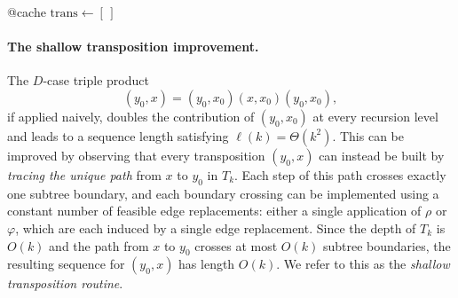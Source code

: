 \begin{algorithm}[ht]
    \DontPrintSemicolon
    \caption{Factoring a permutation into a \tFer sequence for $T_k$.}
    \label{alg:RecursiveFer}
    @cache
    \smallskip
    $\mathrm{trans} \leftarrow [\,]$\;
\end{algorithm}

\paragraph{The shallow transposition improvement.}
The $D$-case triple product $$(y_0,x)=(y_0,x_0)(x,x_0)(y_0,x_0),$$ if applied naively, doubles the contribution of $(y_0,x_0)$ at every recursion level and leads to a sequence length satisfying
$\ell(k) = \Theta(k^2)$.
This can be improved by observing that every transposition $(y_0,x)$ can instead be built by \emph{tracing the unique path} from $x$ to $y_0$ in $T_k$.
Each step of this path crosses exactly one subtree boundary, and each boundary crossing can be implemented using a constant number of feasible edge replacements: either a single application of $\rho$ or $\varphi$, which are each induced by a single edge replacement.
Since the depth of $T_k$ is $O(k)$ and the path from $x$ to $y_0$ crosses at most $O(k)$ subtree boundaries, the resulting sequence for $(y_0,x)$ has length $O(k)$.
We refer to this as the \emph{shallow transposition routine}.

